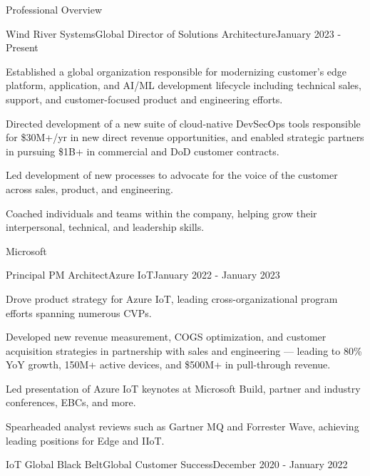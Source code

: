 \documentclass{resume} %
\begin{document}
\begin{rSection}{Professional Overview}
  
  \begin{rNewRole}{Wind River Systems}{Global Director of Solutions Architecture}{January 2023 - Present}
    \item Established a global organization responsible for modernizing customer's edge platform, application, and AI/ML development lifecycle including technical sales, support, and customer-focused product and engineering efforts.
    \item Directed development of a new suite of cloud-native DevSecOps tools responsible for \$30M+/yr in new direct revenue opportunities, and enabled strategic partners in pursuing \$1B+ in commercial and DoD customer contracts.
    \item Led development of new processes to advocate for the voice of the customer across sales, product, and engineering.
    \item Coached individuals and teams within the company, helping grow their interpersonal, technical, and leadership skills.
  \end{rNewRole}

  \begin{rCompany}{Microsoft}{}{}

    \begin{rSubSubsection}{Principal PM Architect}{Azure IoT}{January 2022 - January 2023}
        
      \item Drove product strategy for Azure IoT, leading cross-organizational program efforts spanning numerous CVPs.
      \item Developed new revenue measurement, COGS optimization, and customer acquisition strategies in partnership with sales and engineering --- leading to 80\% YoY growth, 150M+ active devices, and \$500M+ in pull-through revenue.
      \item Led presentation of Azure IoT keynotes at Microsoft Build, partner and industry conferences, EBCs, and more.
      \item Spearheaded analyst reviews such as Gartner MQ and Forrester Wave, achieving leading positions for Edge and IIoT.
      
    \end{rSubSubsection}

    \begin{rSubSubsection}{IoT Global Black Belt}{Global Customer Success}{December 2020 - January 2022}
        

\end{rSubSubsection}
\end{rCompany}
\end{rSection}
\end{document}
